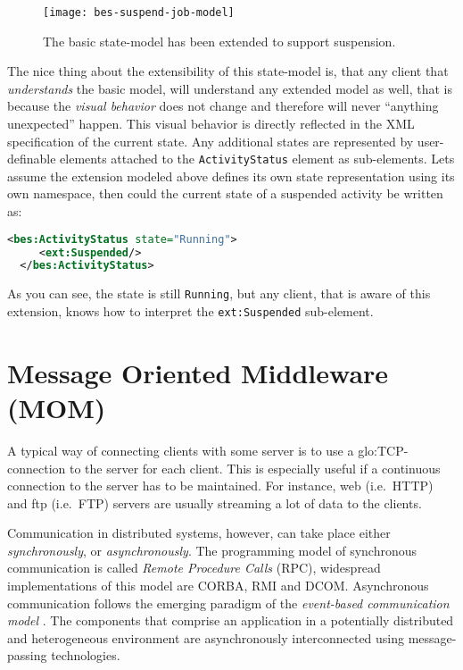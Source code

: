 \begin{figure}[h]
  \centering
  \texttt{[image: bes-suspend-job-model]}
  \caption[Extended  BES Job-State-Model]{The  basic state-model  has been
    extended to support suspension.}
  \label{fig:bes-suspend-model}
\end{figure}

The nice  thing about the extensibility  of this state-model  is, that any
client  that  \emph{understands}  the  basic model,  will  understand  any
extended model  as well, that  is because the \emph{visual  behavior} does
not change  and therefore will never ``anything  unexpected'' happen. This
visual  behavior is  directly reflected  in the  XML specification  of the
current state.   Any additional  states are represented  by user-definable
elements attached to  the \texttt{ActivityStatus} element as sub-elements.
Lets   assume  the  extension   modeled  above   defines  its   own  state
representation using its own namespace,  then could the current state of a
suspended activity be written as:

\begin{lstlisting}[language=XML]
  <bes:ActivityStatus state="Running">
     <ext:Suspended/>
  </bes:ActivityStatus>
\end{lstlisting}

As you can see, the state  is still \texttt{Running}, but any client, that
is   aware    of   this   extension,   knows   how    to   interpret   the
\texttt{ext:Suspended} sub-element.

\section[Message Oriented Middleware]{Message Oriented Middleware (MOM)}
\label{sec:basic-communcation-architecture}

A  typical  way  of connecting  clients  with  some  server  is to  use  a
\gls{glo:TCP}-connection to the server for each client. This is especially
useful if a continuous connection to  the server has to be maintained. For
instance, web (i.e.~HTTP) and ftp (i.e.~FTP) servers are usually streaming
a lot of data to the clients.

Communication  in  distributed systems,  however,  can  take place  either
\emph{synchronously}, or  \emph{asynchronously}. The programming  model of
synchronous communication  is called \emph{Remote  Procedure Calls} (RPC),
widespread  implementations  of  this  model  are  CORBA,  RMI  and  DCOM.
Asynchronous   communication  follows   the  emerging   paradigm   of  the
\emph{event-based  communication  model}  \cite{MeCa:2005:Taxonomy}.   The
components that  comprise an application in a  potentially distributed and
heterogeneous   environment   are   asynchronously  interconnected   using
message-passing technologies.

